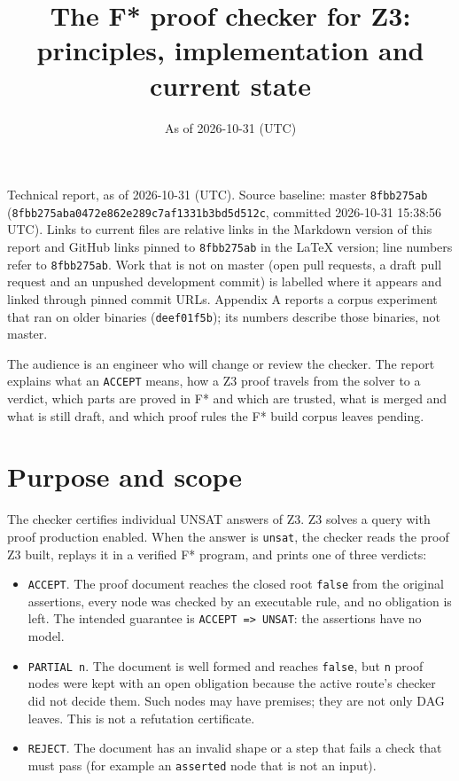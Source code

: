 \documentclass[10pt,a4paper]{article}
\title{The F* proof checker for Z3: principles, implementation and current state}
\author{}
\date{As of 2026-10-31 (UTC)}
\begin{document}
\maketitle
Technical report, as of 2026-10-31 (UTC). Source baseline: master \texttt{8fbb275ab} (\texttt{8fbb275aba0472e8\allowbreak{}62e289c7af1331b3\allowbreak{}bd5d512c}, committed 2026-10-31 15:38:56 UTC). Links to current files are relative links in the Markdown version of this report and GitHub links pinned to \texttt{8fbb275ab} in the LaTeX version; line numbers refer to \texttt{8fbb275ab}. Work that is not on master (open pull requests, a draft pull request and an unpushed development commit) is labelled where it appears and linked through pinned commit URLs. Appendix A reports a corpus experiment that ran on older binaries (\texttt{deef01f5b}); its numbers describe those binaries, not master.

The audience is an engineer who will change or review the checker. The report explains what an \texttt{ACCEPT} means, how a Z3 proof travels from the solver to a verdict, which parts are proved in F* and which are trusted, what is merged and what is still draft, and which proof rules the F* build corpus leaves pending.

\tableofcontents

\section{Purpose and scope}\label{sec:1-purpose-and-scope}

The checker certifies individual UNSAT answers of Z3. Z3 solves a query with proof production enabled. When the answer is \texttt{unsat}, the checker reads the proof Z3 built, replays it in a verified F* program, and prints one of three verdicts:

\begin{itemize}\setlength{\itemsep}{1pt}\setlength{\parskip}{0pt}

\item \texttt{ACCEPT}. The proof document reaches the closed root \texttt{false} from the original assertions, every node was checked by an executable rule, and no obligation is left. The intended guarantee is \texttt{ACCEPT =\allowbreak{}> UNSAT}: the assertions have no model.

\item \texttt{PARTIAL n}. The document is well formed and reaches \texttt{false}, but \texttt{n} proof nodes were kept with an open obligation because the active route's checker did not decide them. Such nodes may have premises; they are not only DAG leaves. This is not a refutation certificate.

\item \texttt{REJECT}. The document has an invalid shape or a step that fails a check that must pass (for example an \texttt{asserted} node that is not an input).

\end{itemize}
\end{document}
